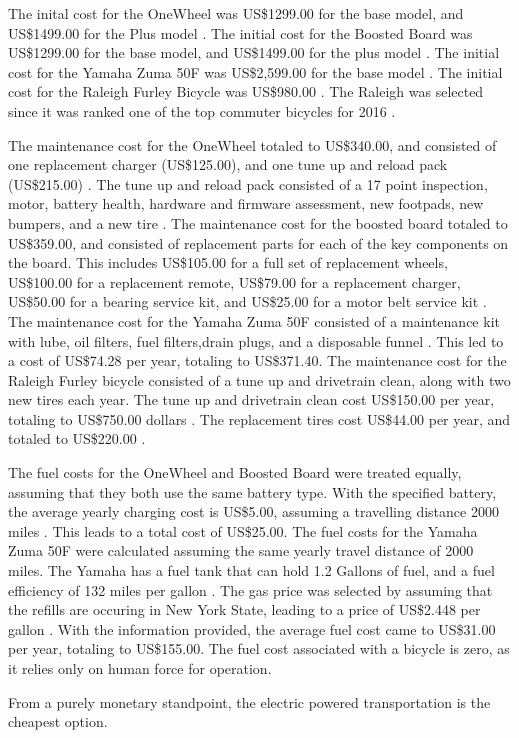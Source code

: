 The inital cost for the OneWheel was US\$1299.00 for the base model, and US\$1499.00 for the Plus model \cite{wheelcost}.	
The initial cost for the Boosted Board was US\$1299.00 for the base model, and US\$1499.00 for the plus model \cite{boardcost}.
The initial cost for the Yamaha Zuma 50F was US\$2,599.00 for the base model \cite{Yamaha}.
The initial cost for the Raleigh Furley Bicycle was US\$980.00 \cite{Raleigh}. 
The Raleigh was selected since it was ranked one of the top commuter bicycles for 2016 \cite{BikeMagazine}.
\par
The maintenance cost for the OneWheel totaled to US\$340.00, and consisted of one replacement charger (US\$125.00), and one tune up and reload pack (US\$215.00) \cite{wheelcost}.
The tune up and reload pack consisted of a 17 point inspection, motor, battery health, hardware and firmware assessment, new footpads, new bumpers, and a new tire \cite{wheelcost}.
The maintenance cost for the boosted board totaled to US\$359.00, and consisted of replacement parts for each of the key components on the board. This includes US\$105.00 for a full set of replacement wheels, US\$100.00 for a replacement remote, US\$79.00 for a replacement charger, US\$50.00 for a bearing service kit, and US\$25.00 for a motor belt service kit \cite{boardcost}.
The maintenance cost for the Yamaha Zuma 50F consisted of a maintenance kit with lube, oil filters, fuel filters,drain plugs, and a disposable funnel \cite{YamahaMaintenance}. 
This led to a cost of US\$74.28 per year, totaling to US\$371.40.
The maintenance cost for the Raleigh Furley bicycle consisted of a tune up and drivetrain clean, along with two new tires each year. 
The tune up and drivetrain clean cost US\$150.00 per year, totaling to US\$750.00 dollars \cite{bikerepair}. 
The replacement tires cost US\$44.00 per year, and totaled to US\$220.00 \cite{CanadianTire}.
\par
The fuel costs for the OneWheel and Boosted Board were treated equally, assuming that they both use the same battery type. With the specified battery, the average yearly charging cost is US\$5.00, assuming a travelling distance 2000 miles \cite{boostedkickstart}. 
This leads to a total cost of US\$25.00.
The fuel costs for the Yamaha Zuma 50F were calculated assuming the same yearly travel distance of 2000 miles.
The Yamaha has a fuel tank that can hold 1.2 Gallons of fuel, and a fuel efficiency of 132 miles per gallon \cite{Yamaha}.
The gas price was selected by assuming that the refills are occuring in New York State, leading to a price of US\$2.448 per gallon \cite{gasprice}.
With the information provided, the average fuel cost came to US\$31.00 per year, totaling to US\$155.00.
The fuel cost associated with a bicycle is zero, as it relies only on human force for operation.
\par
From a purely monetary standpoint, the electric powered transportation is the cheapest option.

